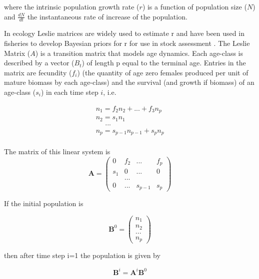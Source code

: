 \documentclass[12pt,doublespacing,a4paper]{ouparticle}
\begin{document}
\noindent where the intrinsic population growth rate ($r$) is a function of population size ($N$) and $\frac{dN}{dt}$ the instantaneous rate of increase of the population.

In ecology Leslie matrices \citep{leslie1945use} are widely used to estimate r \citep{picard2009finding} and have been used in fisheries to develop Bayesian priors for r for use in stock assessment \citep[see][]{mcallister2001using}. The Leslie Matrix ($A$) is a transition matrix that models age dynamics. Each age-class is described by a vector ($B_t$) of length p equal to the terminal age. Entries in the matrix are fecundity ($f_i$) (the quantity of age zero females produced per unit of mature biomass by each age-class) and the survival (and growth if biomass) of an age-class ($s_i$) in each time step $i$, i.e.

\begin{equation}
\begin{array}{l}
n_{1}= f_{2}n_{2}+ ... + f_{3}n_{p}\\
n_{2}=s_{1}n_{1}\\
~~~~~~...\\
n_{p}=s_{p-1}n_{p-1}+s_{p}n_{p}\\
\end{array}
\end{equation}

The matrix of this linear system is 
\begin{equation}
\mathbf{A}=%
\begin{pmatrix}
0 & f_{2} & ... & f_{p} \\ 
s_{1} & 0 & ... & 0 \\ 
 &...&\\
0 & ... & s_{p-1} & s_{p}%
\end{pmatrix}%
\end{equation}

If the initial population is

\begin{equation}
\mathbf{B}^{0}=%
\begin{pmatrix}
n_{1} \\ 
n_{2} \\ 
...\\
n_{p}%
\end{pmatrix}%
\end{equation}

then after time step i=1 the population is given by

\begin{equation}
\mathbf{B}^{i}=\mathbf{A}^{i}\mathbf{B}^{0}
\end{equation}
\end{document}
